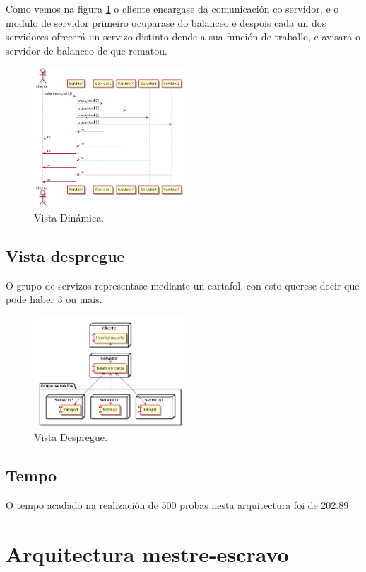 \documentclass[DIV=calc,paper=a4,fontsize=11pt,onecolumn]{scrartcl}	 %
\begin{document}
Como vemos na figura \ref{fig:dinCS} o cliente encargase da comunicación co servidor, e o modulo de servidor primeiro ocuparase do balanceo e despois cada un dos servidores ofrecerá un servizo distinto dende a sua función de traballo, e avisará o servidor de balanceo de que rematou.
\begin{figure}[!h]
\centering
\includegraphics[width = 0.5\textwidth]{./figuras/dinamicoCS.png}
\caption{Vista Dinámica.}
\label{fig:dinCS}
\end{figure}

\newpage
\subsection{Vista despregue}

O grupo de servizos representase mediante un cartafol, con esto querese decir que pode haber 3 ou mais.
\begin{figure}[]
\centering
\includegraphics[width = 0.5\textwidth]{./figuras/despCS.png}
\caption{Vista Despregue.}
\label{fig:despCS}
\end{figure}
\subsection{Tempo}
O tempo acadado na realización de 500 probas nesta arquitectura foi de 202.89

\newpage
\section{Arquitectura mestre-escravo}
\end{document}

